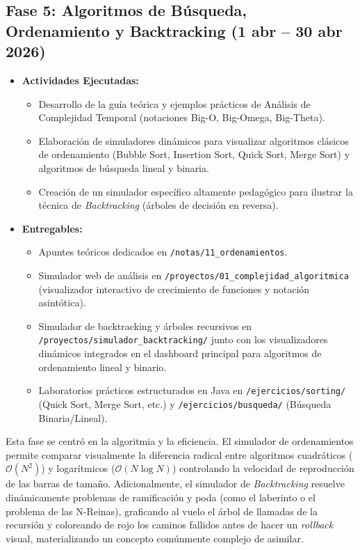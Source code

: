 \documentclass[12 pt]{article}
\begin{document}
\subsection*{Fase 5: Algoritmos de Búsqueda, Ordenamiento y Backtracking (1 abr – 30 abr 2026)}
\begin{itemize}
    \item \textbf{Actividades Ejecutadas:}
    \begin{itemize}
        \item Desarrollo de la guía teórica y ejemplos prácticos de Análisis de Complejidad Temporal (notaciones Big-O, Big-Omega, Big-Theta).
        \item Elaboración de simuladores dinámicos para visualizar algoritmos clásicos de ordenamiento (Bubble Sort, Insertion Sort, Quick Sort, Merge Sort) y algoritmos de búsqueda lineal y binaria.
        \item Creación de un simulador específico altamente pedagógico para ilustrar la técnica de \emph{Backtracking} (árboles de decisión en reversa).
    \end{itemize}
    \item \textbf{Entregables:}
    \begin{itemize}
        \item Apuntes teóricos dedicados en \texttt{/notas/11\_ordenamientos}.
        \item Simulador web de análisis en \texttt{/proyectos/01\_complejidad\_algoritmica} (visualizador interactivo de crecimiento de funciones y notación asintótica).
        \item Simulador de backtracking y árboles recursivos en \texttt{/proyectos/simulador\_backtracking/} junto con los visualizadores dinámicos integrados en el dashboard principal para algoritmos de ordenamiento lineal y binario.
        \item Laboratorios prácticos estructurados en Java en \texttt{/ejercicios/sorting/} (Quick Sort, Merge Sort, etc.) y \texttt{/ejercicios/busqueda/} (Búsqueda Binaria/Lineal).
    \end{itemize}
\end{itemize}

Esta fase se centró en la algoritmia y la eficiencia. El simulador de ordenamientos permite comparar visualmente la diferencia radical entre algoritmos cuadráticos ($\mathcal{O}(N^2)$) y logarítmicos ($\mathcal{O}(N \log N)$) controlando la velocidad de reproducción de las barras de tamaño. Adicionalmente, el simulador de \emph{Backtracking} resuelve dinámicamente problemas de ramificación y poda (como el laberinto o el problema de las N-Reinas), graficando al vuelo el árbol de llamadas de la recursión y coloreando de rojo los caminos fallidos antes de hacer un \emph{rollback} visual, materializando un concepto comúnmente complejo de asimilar.
\end{document}
